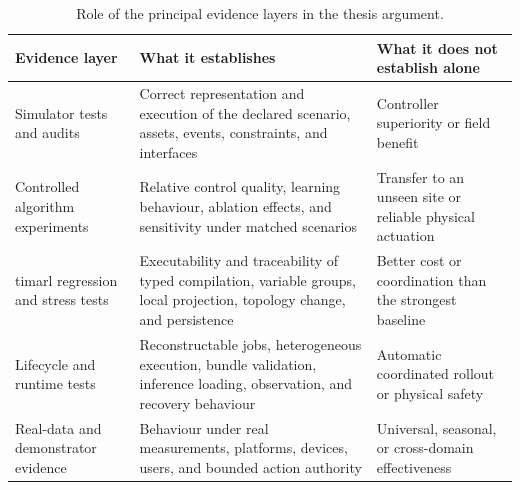 \begin{table}[htbp]
\centering
\caption{Role of the principal evidence layers in the thesis argument.}
\label{tab:discussion-evidence-boundaries}
\small
\begin{tabularx}{\textwidth}{@{}p{}p{}X@{}}
\toprule
\textbf{Evidence layer} & \textbf{What it establishes} & \textbf{What it does not establish alone} \\
\midrule
Simulator tests and audits & Correct representation and execution of the declared scenario, assets, events, constraints, and interfaces & Controller superiority or field benefit \\
Controlled algorithm experiments & Relative control quality, learning behaviour, ablation effects, and sensitivity under matched scenarios & Transfer to an unseen site or reliable physical actuation \\
\gls{timarl} regression and stress tests & Executability and traceability of typed compilation, variable groups, local projection, topology change, and persistence & Better cost or coordination than the strongest baseline \\
Lifecycle and runtime tests & Reconstructable jobs, heterogeneous execution, bundle validation, inference loading, observation, and recovery behaviour & Automatic coordinated rollout or physical safety \\
Real-data and demonstrator evidence & Behaviour under real measurements, platforms, devices, users, and bounded action authority & Universal, seasonal, or cross-domain effectiveness \\
\bottomrule
\end{tabularx}
\end{table}


